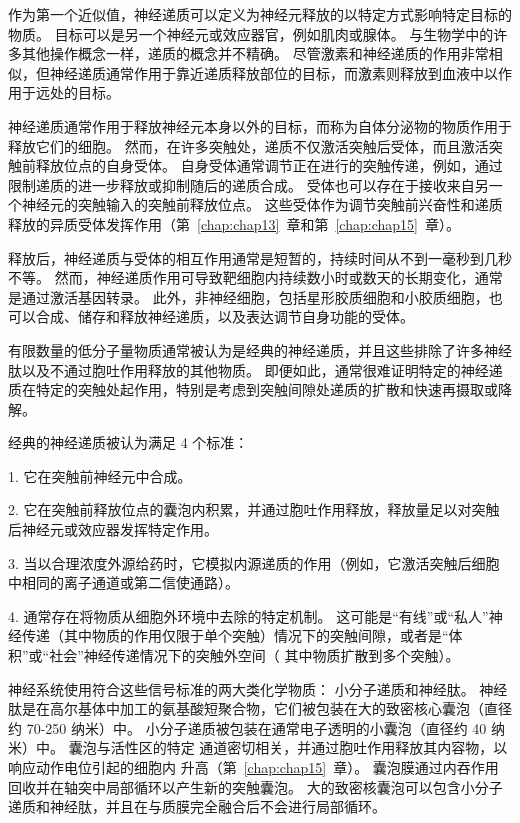 作为第一个近似值，神经递质可以定义为神经元释放的以特定方式影响特定目标的物质。
目标可以是另一个神经元或效应器官，例如肌肉或腺体。 
与生物学中的许多其他操作概念一样，递质的概念并不精确。
尽管激素和神经递质的作用非常相似，但神经递质通常作用于靠近递质释放部位的目标，而激素则释放到血液中以作用于远处的目标。


神经递质通常作用于释放神经元本身以外的目标，而称为自体分泌物的物质作用于释放它们的细胞。
然而，在许多突触处，递质不仅激活突触后受体，而且激活突触前释放位点的自身受体。
自身受体通常调节正在进行的突触传递，例如，通过限制递质的进一步释放或抑制随后的递质合成。
受体也可以存在于接收来自另一个神经元的突触输入的突触前释放位点。
这些受体作为调节突触前兴奋性和递质释放的异质受体发挥作用（第~\ref{chap:chap13}~章和第~\ref{chap:chap15}~章）。


释放后，神经递质与受体的相互作用通常是短暂的，持续时间从不到一毫秒到几秒不等。
然而，神经递质作用可导致靶细胞内持续数小时或数天的长期变化，通常是通过激活基因转录。
此外，非神经细胞，包括星形胶质细胞和小胶质细胞，也可以合成、储存和释放神经递质，以及表达调节自身功能的受体。


有限数量的低分子量物质通常被认为是经典的神经递质，并且这些排除了许多神经肽以及不通过胞吐作用释放的其他物质。
即便如此，通常很难证明特定的神经递质在特定的突触处起作用，特别是考虑到突触间隙处递质的扩散和快速再摄取或降解。


经典的神经递质被认为满足 4 个标准：

1. 它在突触前神经元中合成。

2. 它在突触前释放位点的囊泡内积累，并通过胞吐作用释放，释放量足以对突触后神经元或效应器发挥特定作用。

3. 当以合理浓度外源给药时，它模拟内源递质的作用（例如，它激活突触后细胞中相同的离子通道或第二信使通路）。

4. 通常存在将物质从细胞外环境中去除的特定机制。 这可能是“有线”或“私人”神经传递（其中物质的作用仅限于单个突触）情况下的突触间隙，或者是“体积”或“社会”神经传递情况下的突触外空间（ 其中物质扩散到多个突触）。


神经系统使用符合这些信号标准的两大类化学物质：
小分子递质和神经肽。
神经肽是在高尔基体中加工的氨基酸短聚合物，它们被包装在大的致密核心囊泡（直径约 70-250 纳米）中。
小分子递质被包装在通常电子透明的小囊泡（直径约 40 纳米）中。
囊泡与活性区的特定  通道密切相关，并通过胞吐作用释放其内容物，以响应动作电位引起的细胞内  升高（第~\ref{chap:chap15}~章）。
囊泡膜通过内吞作用回收并在轴突中局部循环以产生新的突触囊泡。
大的致密核囊泡可以包含小分子递质和神经肽，并且在与质膜完全融合后不会进行局部循环。



